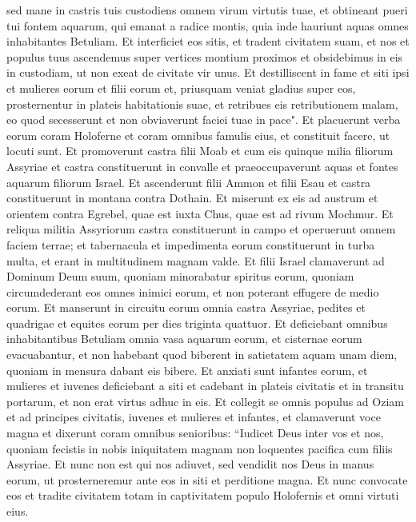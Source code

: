\begin{biblechapter}
\verse sed mane in castris tuis custodiens omnem virum virtutis tuae, et obtineant pueri tui fontem aquarum, qui emanat a radice montis, 
\verse quia inde hauriunt aquas omnes inhabitantes Betuliam. Et interficiet eos sitis, et tradent civitatem suam, et nos et populus tuus ascendemus super vertices montium proximos et obsidebimus in eis in custodiam, ut non exeat de civitate vir unus. 
\verse Et destilliscent in fame et siti ipsi et mulieres eorum et filii eorum et, priusquam veniat gladius super eos, prosternentur in plateis habitationis suae,  
\verse et retribues eis retributionem malam, eo quod secesserunt et non obviaverunt faciei tuae in pace". 
\verse Et placuerunt verba eorum coram Holoferne et coram omnibus famulis eius, et constituit facere, ut locuti sunt. 
\verse Et promoverunt castra filii Moab et cum eis quinque milia filiorum Assyriae et castra constituerunt in convalle et praeoccupaverunt aquas et fontes aquarum filiorum Israel. 
\verse Et ascenderunt filii Ammon et filii Esau et castra constituerunt in montana contra Dothain. Et miserunt ex eis ad austrum et orientem contra Egrebel, quae est iuxta Chus, quae est ad rivum Mochmur. Et reliqua militia Assyriorum castra constituerunt in campo et operuerunt omnem faciem terrae; et tabernacula et impedimenta eorum constituerunt in turba multa, et erant in multitudinem magnam valde. 
\verse Et filii Israel clamaverunt ad Dominum Deum suum, quoniam minorabatur spiritus eorum, quoniam circumdederant eos omnes inimici eorum, et non poterant effugere de medio eorum. 
\verse Et manserunt in circuitu eorum omnia castra Assyriae, pedites et quadrigae et equites eorum per dies triginta quattuor. Et deficiebant omnibus inhabitantibus Betuliam omnia vasa aquarum eorum, 
\verse et cisternae eorum evacuabantur, et non habebant quod biberent in satietatem aquam unam diem, quoniam in mensura dabant eis bibere. 
\verse Et anxiati sunt infantes eorum, et mulieres et iuvenes deficiebant a siti et cadebant in plateis civitatis et in transitu portarum, et non erat virtus adhuc in eis. 
\verse Et collegit se omnis populus ad Oziam et ad principes civitatis, iuvenes et mulieres et infantes, et clamaverunt voce magna et dixerunt coram omnibus senioribus: 
\verse “Iudicet Deus inter vos et nos, quoniam fecistis in nobis iniquitatem magnam non loquentes pacifica cum filiis Assyriae. 
\verse Et nunc non est qui nos adiuvet, sed vendidit nos Deus in manus eorum, ut prosterneremur ante eos in siti et perditione magna. 
\verse Et nunc convocate eos et tradite civitatem totam in captivitatem populo Holofernis et omni virtuti eius. 

\end{biblechapter}
